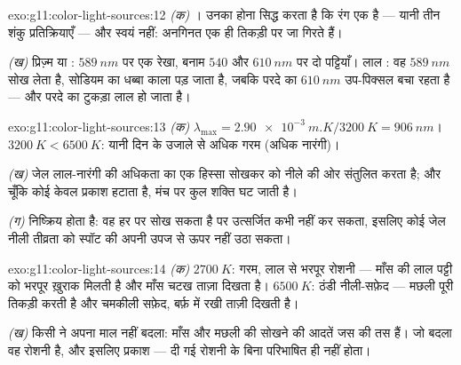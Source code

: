 \begin{solution}{exo:g11:color-light-sources:12}
\emph{(क)} । उनका होना सिद्ध करता है कि रंग एक
 है --- यानी तीन शंकु प्रतिक्रियाएँ --- और स्वयं
 नहीं: अनगिनत  एक ही तिकड़ी पर जा गिरते हैं।

\emph{(ख)} प्रिज़्म या : $\qty{589}{nm}$ पर एक रेखा, बनाम
$540$ और $\qty{610}{nm}$ पर दो पट्टियाँ। लाल : वह $\qty{589}{nm}$ सोख लेता
है, सोडियम का धब्बा काला पड़ जाता है, जबकि परदे का $\qty{610}{nm}$ उप-पिक्सल बचा
रहता है --- और परदे का टुकड़ा लाल हो जाता है।
\end{solution}

\begin{solution}{exo:g11:color-light-sources:13}
\emph{(क)} $\lambda_{\max} = \qty{2.90e-3}{m.K}/\qty{3200}{K} =
\qty{906}{nm}$।  $\qty{3200}{K} < \qty{6500}{K}$: यानी दिन के उजाले से अधिक
गरम (अधिक नारंगी)।

\emph{(ख)} जेल लाल-नारंगी की अधिकता का एक हिस्सा सोखकर 
को नीले की ओर संतुलित करता है; और चूँकि कोई  केवल प्रकाश
हटाता है, मंच पर कुल शक्ति घट जाती है।

\emph{(ग)}  निष्क्रिय होता है: वह हर 
पर सोख सकता है पर उत्सर्जित कभी नहीं कर सकता, इसलिए कोई जेल नीली तीव्रता
को स्पॉट की अपनी उपज से ऊपर नहीं उठा सकता।
\end{solution}

\begin{solution}{exo:g11:color-light-sources:14}
\emph{(क)} $\qty{2700}{K}$: गरम, लाल से भरपूर रोशनी --- माँस की लाल पट्टी को
भरपूर ख़ुराक मिलती है और माँस चटख ताज़ा दिखता है। $\qty{6500}{K}$: ठंडी नीली-सफ़ेद
--- मछली पूरी तिकड़ी  करती है और चमकीली सफ़ेद, बर्फ़ में
रखी ताज़ी दिखती है।

\emph{(ख)} किसी ने अपना माल नहीं बदला: माँस और मछली की सोखने की आदतें
जस की तस हैं। जो बदला वह रोशनी है, और इसलिए  प्रकाश ---  दी गई रोशनी के बिना परिभाषित ही नहीं होता।
\end{solution}

